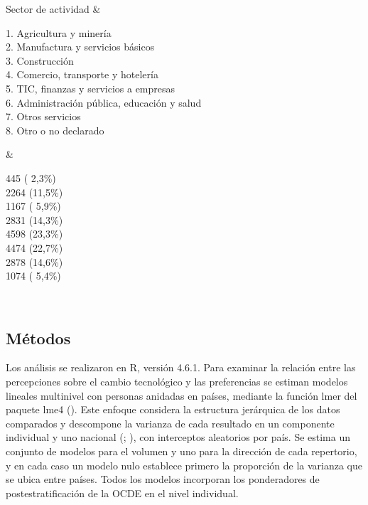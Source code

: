 \documentclass[
  spanish,
  12pt,
]{article}
\begin{document}
\begin{longtable}[]
Sector de actividad & \begin{minipage}[t]{\linewidth}\raggedright
1. Agricultura y minería\\
2. Manufactura y servicios básicos\\
3. Construcción\\
4. Comercio, transporte y hotelería\\
5. TIC, finanzas y servicios a empresas\\
6. Administración pública, educación y salud\\
7. Otros servicios\\
8. Otro o no declarado\strut
\end{minipage} & \begin{minipage}[t]{\linewidth}\raggedright
445 ( 2,3\%)\\
2264 (11,5\%)\\
1167 ( 5,9\%)\\
2831 (14,3\%)\\
4598 (23,3\%)\\
4474 (22,7\%)\\
2878 (14,6\%)\\
1074 ( 5,4\%)\strut
\end{minipage} \\
\end{longtable}

\subsection{Métodos}\label{muxe9todos}

Los análisis se realizaron en R, versión 4.6.1. Para examinar la
relación entre las percepciones sobre el cambio tecnológico y las
preferencias se estiman modelos lineales multinivel con personas
anidadas en países, mediante la función lmer del paquete lme4
().
Este enfoque considera la estructura jerárquica de los datos comparados
y descompone la varianza de cada resultado en un componente individual y
uno nacional
(;
),
con interceptos aleatorios por país. Se estima un conjunto de modelos
para el volumen y uno para la dirección de cada repertorio, y en cada
caso un modelo nulo establece primero la proporción de la varianza que
se ubica entre países. Todos los modelos incorporan los ponderadores de
postestratificación de la OCDE en el nivel individual.
\end{document}
